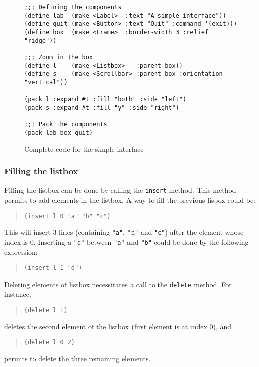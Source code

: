 \begin{figure}
{\footnotesize
\begin{verbatim}
;;; Defining the components
(define lab  (make <Label>  :text "A simple interface"))
(define quit (make <Button> :text "Quit" :command '(exit)))
(define box  (make <Frame>  :border-width 3 :relief "ridge"))

;;; Zoom in the box
(define l    (make <Listbox>   :parent box))
(define s    (make <Scrollbar> :parent box :orientation "vertical"))

(pack l :expand #t :fill "both" :side "left")
(pack s :expand #t :fill "y" :side "right")

;;; Pack the components
(pack lab box quit)
\end{verbatim}
}
\caption{Complete code for the simple interface}
\label{simple:the_code}
\end{figure}

\subsubsection{Filling the listbox}

Filling the listbox can be done by calling the {\tt insert}
 method. This method permits to add elements in the
listbox. A way to fill the previous lisbox could be:
\begin{quote}
\begin{verbatim}
(insert l 0 "a" "b" "c")
\end{verbatim}
\end{quote}
This will insert 3 lines (containing {\tt "a"}, {\tt "b"} and {\tt "c"})
after the element whose index is 0. Inserting a {\tt "d"} between {\tt "a"}
and {\tt "b"} could be done by the following expression:
\begin{quote}
\begin{verbatim}
(insert l 1 "d")
\end{verbatim}
\end{quote}

Deleting elements of listbox necessitates a call to the {\tt delete}
method. For instance,
\begin{quote}
\begin{verbatim}
(delete l 1)
\end{verbatim}
\end{quote}
deletes the second element of the listbox (first element is at index 0), and
\begin{quote}
\begin{verbatim}
(delete l 0 2)
\end{verbatim}
\end{quote}
permits to delete the three remaining elements. 

